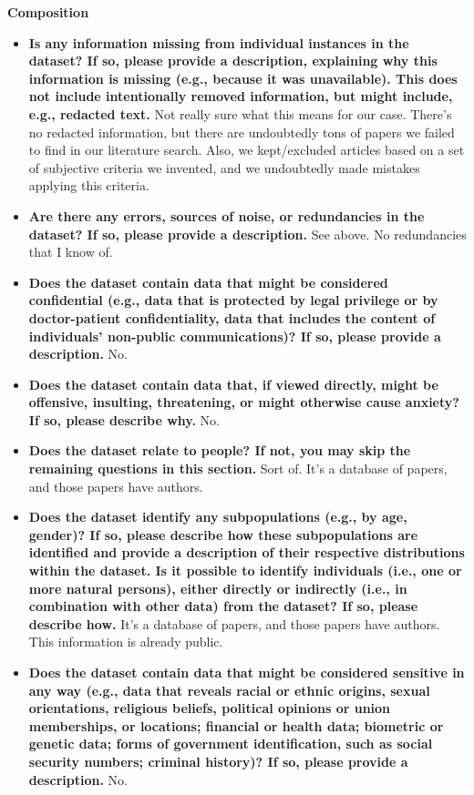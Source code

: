 \documentclass{article}
\begin{document}
\textbf{Composition}

\begin{itemize}
    \item \textbf{Is any information missing from individual instances in the dataset? If so, please provide a description, explaining why this information is missing (e.g., because it was unavailable). This does not include intentionally removed information, but might include, e.g., redacted text.} Not really sure what this means for our case.  There's no redacted information, but there are undoubtedly tons of papers we failed to find in our literature search.  Also, we kept/excluded articles based on a set of subjective criteria we invented, and we undoubtedly made mistakes applying this criteria.
    \item \textbf{Are there any errors, sources of noise, or redundancies in the dataset? If so, please provide a description.} See above.  No redundancies that I know of.
    \item \textbf{Does the dataset contain data that might be considered confidential (e.g., data that is protected by legal privilege or by doctor-patient confidentiality, data that includes the content of individuals’ non-public communications)? If so, please provide a description.} No.
    \item \textbf{Does the dataset contain data that, if viewed directly, might be offensive, insulting, threatening, or might otherwise cause anxiety? If so, please describe why.} No.
    \item \textbf{Does the dataset relate to people? If not, you may skip the remaining questions in this section.} Sort of. It's a database of papers, and those papers have authors.
    \item \textbf{Does the dataset identify any subpopulations (e.g., by age, gender)? If so, please describe how these subpopulations are identified and provide a description of their respective distributions within the dataset. Is it possible to identify individuals (i.e., one or more natural persons), either directly or indirectly (i.e., in combination with other data) from the dataset? If so, please describe how.} It's a database of papers, and those papers have authors.  This information is already public.
    \item \textbf{Does the dataset contain data that might be considered sensitive in any way (e.g., data that reveals racial or ethnic origins, sexual orientations, religious beliefs, political opinions or union memberships, or locations; financial or health data; biometric or genetic data; forms of government identification, such as social security numbers; criminal history)? If so, please provide a description.} No.
\end{itemize}
\end{document}
